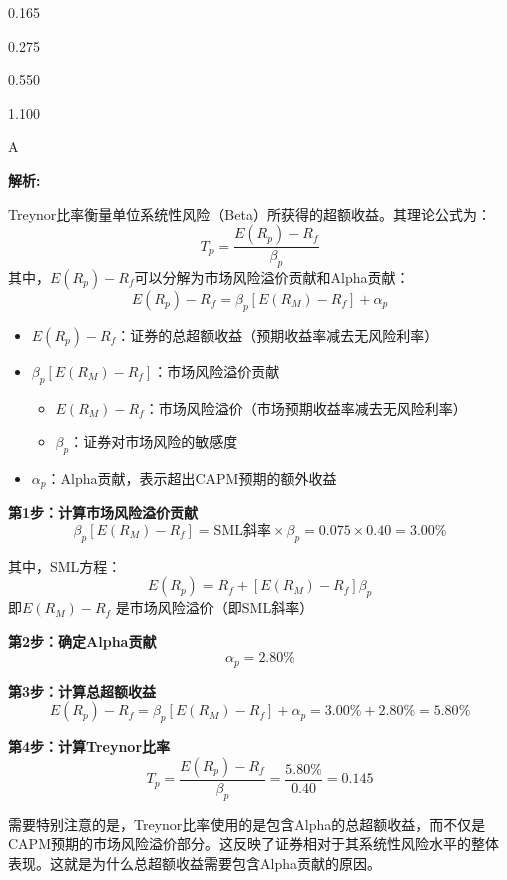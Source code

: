 \documentclass{article}
\newenvironment{explanation}
{\textbf{解析:}\par}
{\par}
\begin{document}
\begin{choices}
    \item 0.165
    \item 0.275
    \item 0.550
    \item 1.100
\end{choices}

\begin{correctanswer}
    A
\end{correctanswer}

\begin{explanation}
    Treynor比率衡量单位系统性风险（Beta）所获得的超额收益。其理论公式为：
    \[
    T_p = \frac{E(R_p) - R_f}{\beta_p}
    \]
    其中，$E(R_p) - R_f$可以分解为市场风险溢价贡献和Alpha贡献：
    \[
    E(R_p) - R_f = \beta_p[E(R_M) - R_f] + \alpha_p
    \]
    \begin{itemize}
        \item $E(R_p) - R_f$：证券的总超额收益（预期收益率减去无风险利率）
        
        \item $\beta_p[E(R_M) - R_f]$：市场风险溢价贡献
            \begin{itemize}
                \item $E(R_M) - R_f$：市场风险溢价（市场预期收益率减去无风险利率）
                \item $\beta_p$：证券对市场风险的敏感度
            \end{itemize}
            
        \item $\alpha_p$：Alpha贡献，表示超出CAPM预期的额外收益
    \end{itemize}

    \textbf{第1步：计算市场风险溢价贡献}
    \[
    \beta_p[E(R_M) - R_f] = \text{SML斜率} \times \beta_p = 0.075 \times 0.40 = 3.00\%
    \]
    
    其中，SML方程：
    \[
    E(R_p) = R_f + [E(R_M) - R_f]\beta_p
    \]
    即$E(R_M) - R_f$ 是市场风险溢价（即SML斜率）

    \textbf{第2步：确定Alpha贡献}
    \[
    \alpha_p = 2.80\%
    \]

    \textbf{第3步：计算总超额收益}
    \[
    E(R_p) - R_f = \beta_p[E(R_M) - R_f] + \alpha_p = 3.00\% + 2.80\% = 5.80\%
    \]

    \textbf{第4步：计算Treynor比率}
    \[
    T_p = \frac{E(R_p) - R_f}{\beta_p} = \frac{5.80\%}{0.40} = 0.145
    \]

    需要特别注意的是，Treynor比率使用的是包含Alpha的总超额收益，而不仅是CAPM预期的市场风险溢价部分。这反映了证券相对于其系统性风险水平的整体表现。这就是为什么总超额收益需要包含Alpha贡献的原因。
\end{explanation}
\end{document}

